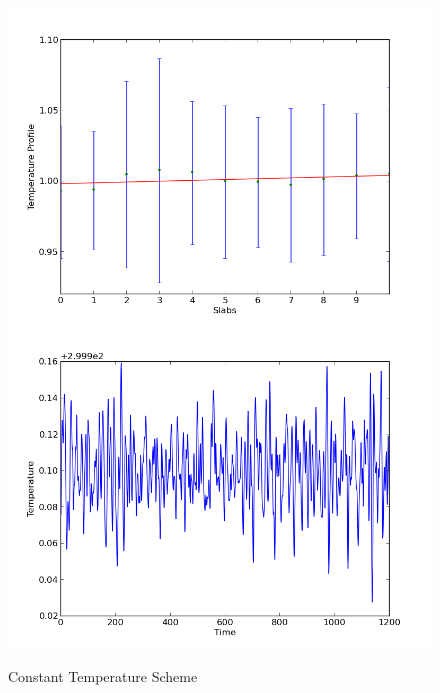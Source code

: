 \documentclass[12pt,a4paper]{article}
\begin{document}
\paragraph{} 
\begin{figure}[!htb]
  \includegraphics[width=\linewidth]{TemperatureProfile_i.png}
\endminipage\hfill
{}
  \includegraphics[width=\linewidth]{TemperatureEvolution_i.png}
 \endminipage\hfill
\caption{Constant Temperature Scheme}
\end{figure}
\appendix
\end{document}
